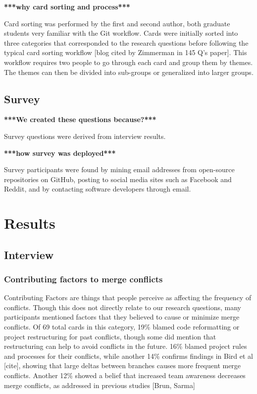 \documentclass[conference]{IEEEtran}
\begin{document}
\textbf{***why card sorting and process***}

Card sorting was performed by the first and second author, both graduate students very familiar with the Git workflow. Cards were initially sorted into three categories that corresponded to the research questions before following the typical card sorting workflow [blog cited by Zimmerman in 145 Q's paper]. This workflow requires two people to go through each card and group them by themes. The themes can then be divided into sub-groups or generalized into larger groups.

\subsection{Survey}

\textbf{***We created these questions because?***}

Survey questions were derived from interview results. 

\textbf{***how survey was deployed***}

Survey participants were found by mining email addresses from open-source repositories on GitHub, posting to social media sites such as Facebook and Reddit, and by contacting software developers through email.

\section{Results}
\subsection{Interview}
\subsubsection{Contributing factors to merge conflicts}

Contributing Factors are things that people perceive as affecting the frequency of conflicts. Though this does not directly relate to our research questions, many participants mentioned factors that they believed to cause or minimize merge conflicts. Of 69 total cards in this category, 19\% blamed code reformatting or project restructuring for past conflicts, though some did mention that restructuring can help to avoid conflicts in the future. 16\% blamed project rules and processes for their conflicts, while another 14\% confirms findings in Bird et al [cite], showing that large deltas between branches causes more frequent merge conflicts. Another 12\% showed a belief that increased team awareness decreases merge conflicts, as addressed in previous studies [Brun, Sarma] 
\end{document}

